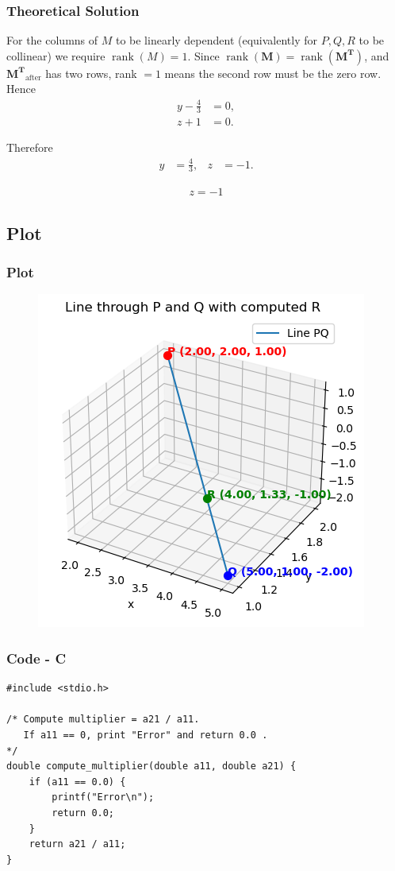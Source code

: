 \documentclass{beamer}
\newcommand{\rank}{\operatorname{rank}}
\theoremstyle{remark}
\let\vec\mathbf
\numberwithin{equation}{section}
\begin{document}
\begin{frame}
\frametitle{Theoretical Solution}
For the columns of $M$ to be linearly dependent (equivalently for $P,Q,R$ to be collinear) we require $\rank(M)=1$.  Since $\rank(\vec{M})=\rank(\vec{M^{\!T}})$, and $\vec{M^{\!T}}_{\text{after}}$ has two rows, rank $=1$ means the second row must be the zero row. Hence
\begin{align}
y - \tfrac{4}{3} &= 0,\\
z + 1 &= 0.
\end{align}

Therefore
\begin{align}
y &= \tfrac{4}{3}, & z &= -1.
\end{align}

\begin{align}
\boxed{z = -1}
\end{align}
\end{frame}

\subsection{Plot}
\begin{frame}
    \frametitle{Plot}
\begin{figure}[H]
   \centering
   \includegraphics[width=0.6\columnwidth]{figs/line_3d.png}
   \end{figure}
\end{frame}

\begin{frame}[fragile]
    \frametitle{Code - C}
    \begin{lstlisting}
#include <stdio.h>

/* Compute multiplier = a21 / a11.
   If a11 == 0, print "Error" and return 0.0 .
*/
double compute_multiplier(double a11, double a21) {
    if (a11 == 0.0) {
        printf("Error\n");
        return 0.0;
    }
    return a21 / a11;
}


\end{lstlisting}
\end{frame}
\end{document}
